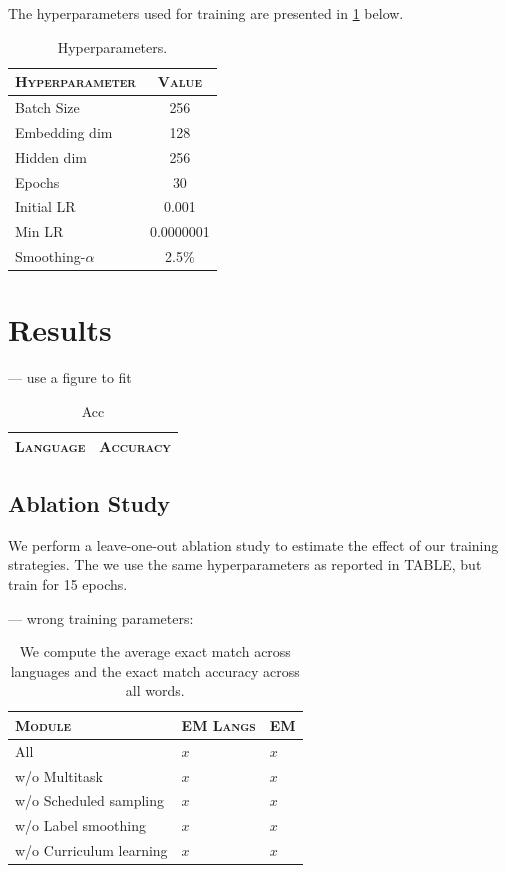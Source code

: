 \documentclass[11pt,a4paper]{article}
\begin{document}
The hyperparameters used for training are presented in \cref{tab:hp} below.
\begin{table}[h]	
\centering
\begin{tabular}{lc}
\textsc{Hyperparameter} & \textsc{Value} \\
  \hline
  Batch Size & 256 \\
  Embedding dim & 128 \\
  Hidden dim & 256 \\
  Epochs & 30 \\
  Initial LR & 0.001 \\
  Min LR & 0.0000001 \\
  Smoothing-$\alpha$ & 2.5\% \\
\end{tabular} 
\caption{Hyperparameters.}
\label{tab:hp}
\end{table}

\section{Results}

--- use a figure to fit
\begin{table}[h]	
\centering
\begin{tabular}{lc}
\textsc{Language} & \textsc{Accuracy} \\
  \hline
  
\end{tabular} 
\caption{Acc}
\label{tab:accuracy}
\end{table}



\subsection{Ablation Study}

We perform a leave-one-out ablation study to estimate the effect of
our training strategies. The we use the same hyperparameters as
reported in TABLE, but train for 15 epochs.


--- wrong training parameters:
\begin{table}[h]	
\centering
\begin{tabular}{lll}
\textsc{Module} & \textsc{EM Langs} & \textsc{EM} \\
  \hline
  All  & $x$ & $x$ \\
  w/o Multitask & $x$ & $x$ \\
  w/o Scheduled sampling & $x$ & $x$ \\
  w/o Label smoothing & $x$ & $x$ \\
  w/o Curriculum learning & $x$ & $x$ \\
\end{tabular} 
\caption{We compute the average exact match across languages and the
exact match accuracy across all words.}
\label{tab:abl}
\end{table}
\end{document}
